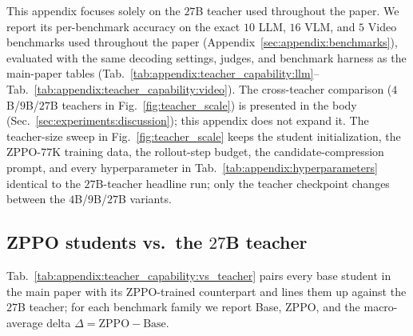 \documentclass{llmxive}
\begin{document}
This appendix focuses solely on the $27$B teacher used throughout the paper. We report its per-benchmark accuracy on the exact $10$ LLM, $16$ VLM, and $5$ Video benchmarks used throughout the paper (Appendix~\ref{sec:appendix:benchmarks}), evaluated with the same decoding settings, judges, and benchmark harness as the main-paper tables (Tab.~\ref{tab:appendix:teacher_capability:llm}--Tab.~\ref{tab:appendix:teacher_capability:video}). The cross-teacher comparison ($4$B/$9$B/$27$B teachers in Fig.~\ref{fig:teacher_scale}) is presented in the body (Sec.~\ref{sec:experiments:discussion}); this appendix does not expand it. The teacher-size sweep in Fig.~\ref{fig:teacher_scale} keeps the student initialization, the ZPPO-$77$K training data, the rollout-step budget, the candidate-compression prompt, and every hyperparameter in Tab.~\ref{tab:appendix:hyperparameters} identical to the $27$B-teacher headline run; only the teacher checkpoint changes between the $4$B/$9$B/$27$B variants.

\subsection{ZPPO students vs.\ the \texorpdfstring{$27$}{27}B teacher}
\label{sec:appendix:teacher_capability:vs_teacher}

Tab.~\ref{tab:appendix:teacher_capability:vs_teacher} pairs every base student in the main paper with its ZPPO-trained counterpart and lines them up against the $27$B teacher; for each benchmark family we report Base, ZPPO, and the macro-average delta $\Delta\!=\!\text{ZPPO}\!-\!\text{Base}$.
\end{document}
